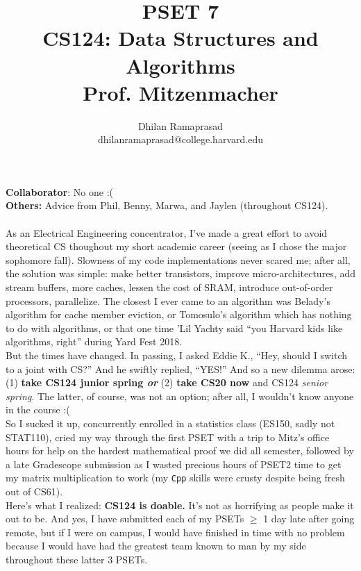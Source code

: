 \documentclass[conference]{styles/acmsiggraph}
\title{\huge PSET 7 \\ \LARGE {CS124: Data Structures and Algorithms \\ Prof. Mitzenmacher}}
\author{\Large Dhilan Ramaprasad \\ dhilanramaprasad@college.harvard.edu}
\newcommand{\?}{\stackrel{?}{=}}
\begin{document}
\maketitle

\textbf{Collaborator}: No one :( \\
\textbf{Others:} Advice from Phil, Benny, Marwa, and Jaylen (throughout CS124). \\
\\
As an Electrical Engineering concentrator, I've made a great effort to avoid theoretical CS thoughout my short academic career (seeing as I chose the major sophomore fall).  Slowness of my code implementations never scared me; after all, the solution was simple: make better transistors, improve micro-architectures, add stream buffers, more caches, lessen the cost of SRAM, introduce out-of-order processors, parallelize.  The closest I ever came to an algorithm was Belady's algorithm for cache member eviction, or Tomosulo's algorithm which has nothing to do with algorithms, or that one time 'Lil Yachty said \enquote{you Harvard kids like algorithms, right} during Yard Fest 2018. \\

But the times have changed.  In passing, I asked Eddie K., \enquote{Hey, should I switch to a joint with CS?}  And he swiftly replied, \enquote{YES!}  And so a new dilemma arose: (1) \textbf{take CS124 junior spring \textit{or}} (2) \textbf{take CS20 now} and CS124 \textit{senior spring}.  The latter, of course, was not an option; after all, I wouldn't know anyone in the course :(  \\

So I sucked it up, concurrently enrolled in a statistics class (ES150, sadly not STAT110), cried my way through the first PSET with a trip to Mitz's office hours for help on the hardest mathematical proof we did all semester, followed by a late Gradescope submission as I wasted precious hours of PSET2 time to get my matrix multiplication to work (my \verb|Cpp| skills were crusty despite being fresh out of CS61). \\

Here's what I realized: \textbf{CS124 is doable.}  It's not as horrifying as people make it out to be.  And yes, I have submitted each of my PSETs $\geq$ 1 day late after going remote, but if I were on campus, I would have finished in time with no problem because I would have had the greatest team known to man by my side throughout these latter 3 PSETs.\\
\end{document}
